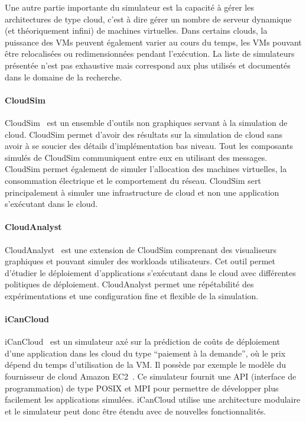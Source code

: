 Une autre partie importante du simulateur est la capacité à gérer les architectures de type cloud, c'est à dire gérer un nombre de serveur dynamique (et théoriquement infini) de machines virtuelles. Dans certains clouds, la puissance des VMs peuvent également varier au cours du temps, les VMs pouvant être relocalisées ou redimensionnées pendant l'exécution. La liste de simulateurs présentée n'est pas exhaustive mais correspond aux plus utilisés et documentés dans le domaine de la recherche.

\paragraph{CloudSim\\}
CloudSim~\cite{cloudsim} est un ensemble d'outils non graphiques servant à la simulation de cloud. CloudSim permet d'avoir des résultats sur la simulation de cloud sans avoir à se soucier des détails d'implémentation bas niveau. Tout les composants simulés de CloudSim communiquent entre eux en utilisant des messages. CloudSim permet également de simuler l'allocation des machines virtuelles, la consommation électrique et le comportement du réseau. CloudSim sert principalement à simuler une infrastructure de cloud et non une application s'exécutant dans le cloud.

\paragraph{CloudAnalyst\\}
CloudAnalyst~\cite{cloudanalyst} est une extension de CloudSim comprenant des visualiseurs graphiques et pouvant simuler des workloads utilisateurs. Cet outil permet d'étudier le déploiement d'applications s'exécutant dans le cloud avec différentes politiques de déploiement. CloudAnalyst permet une répétabilité des expérimentations et une configuration fine et flexible de la simulation.

\paragraph{iCanCloud\\}
iCanCloud~\cite{icancloud} est un simulateur axé sur la prédiction de coûts de déploiement d'une application dans les cloud du type ``paiement à la demande'', où le prix dépend du temps d'utilisation de la VM. Il possède par exemple le modèle du fournisseur de cloud Amazon EC2~\cite{amazon_ec2}. Ce simulateur fournit une API (interface de programmation) de type POSIX et MPI pour permettre de développer plus facilement les applications simulées. iCanCloud utilise une architecture modulaire et le simulateur peut donc être étendu avec de nouvelles fonctionnalités.

